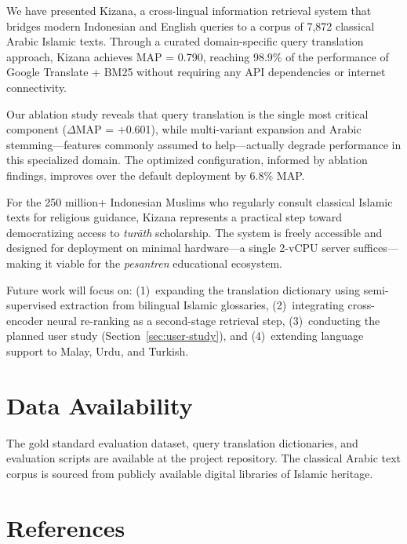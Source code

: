 \documentclass[preprint,12pt,authoryear]{elsarticle}
\begin{document}
We have presented Kizana, a cross-lingual information retrieval system that bridges modern Indonesian and English queries to a corpus of 7,872 classical Arabic Islamic texts. Through a curated domain-specific query translation approach, Kizana achieves MAP = 0.790, reaching 98.9\% of the performance of Google Translate + BM25 without requiring any API dependencies or internet connectivity.

Our ablation study reveals that query translation is the single most critical component ($\Delta$MAP = $+$0.601), while multi-variant expansion and Arabic stemming---features commonly assumed to help---actually degrade performance in this specialized domain. The optimized configuration, informed by ablation findings, improves over the default deployment by 6.8\% MAP.

For the 250 million+ Indonesian Muslims who regularly consult classical Islamic texts for religious guidance, Kizana represents a practical step toward democratizing access to \textit{tur\={a}th} scholarship. The system is freely accessible and designed for deployment on minimal hardware---a single 2-vCPU server suffices---making it viable for the \textit{pesantren} educational ecosystem.

Future work will focus on: (1)~expanding the translation dictionary using semi-supervised extraction from bilingual Islamic glossaries, (2)~integrating cross-encoder neural re-ranking as a second-stage retrieval step, (3)~conducting the planned user study (Section~\ref{sec:user-study}), and (4)~extending language support to Malay, Urdu, and Turkish.

\section*{Data Availability}

The gold standard evaluation dataset, query translation dictionaries, and evaluation scripts are available at the project repository. The classical Arabic text corpus is sourced from publicly available digital libraries of Islamic heritage.

\section*{References}
\end{document}
